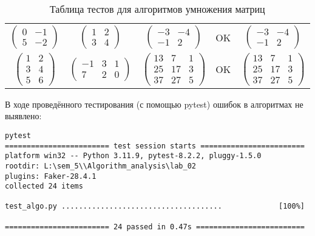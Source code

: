 \begin{table}[H]
\begin{tabular}{|c|c|c|c|c|}
        $\left( \begin{matrix} 0 & -1 \\ 5 & -2 \end{matrix} \right)$ & $\left( \begin{matrix} 1 & 2 \\ 3 & 4 \end{matrix} \right)$ & $\left( \begin{matrix} -3 & -4 \\ -1 & 2 \end{matrix} \right)$ & OK & $\left( \begin{matrix} -3 & -4 \\ -1 & 2 \end{matrix} \right)$ \\
        $\left( \begin{matrix} 1 & 2 \\ 3 & 4 \\ 5 & 6 \end{matrix} \right)$ & $\left( \begin{matrix} -1 & 3 & 1 \\ 7 & 2 & 0 \end{matrix} \right)$ & $\left( \begin{matrix} 13 & 7 & 1 \\ 25 & 17 & 3 \\ 37 & 27 & 5 \end{matrix} \right)$ & OK & $\left( \begin{matrix} 13 & 7 & 1 \\ 25 & 17 & 3 \\ 37 & 27 & 5 \end{matrix} \right)$ \\
        \hline
    \end{tabular}
    \caption{Таблица тестов для алгоритмов умножения матриц}
\end{table}

В ходе проведённого тестирования (с помощью pytest) ошибок в алгоритмах не выявлено:

\vspace{0.25cm}
\begin{lstlisting}[caption=тестирование алгоритмов с помощью pytest]
pytest
======================== test session starts ========================
platform win32 -- Python 3.11.9, pytest-8.2.2, pluggy-1.5.0
rootdir: L:\sem_5\\Algorithm_analysis\lab_02
plugins: Faker-28.4.1
collected 24 items                                                                                                                                                                

test_algo.py .....................................             [100%]

======================== 24 passed in 0.47s =========================
\end{lstlisting}

\newpage